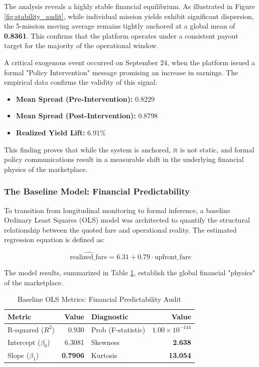 The analysis reveals a highly stable financial equilibrium. As illustrated in Figure \ref{fig:stability_audit}, while individual mission yields exhibit significant dispersion, the 5-mission moving average remains tightly anchored at a global mean of \textbf{0.8361}. This confirms that the platform operates under a consistent payout target for the majority of the operational window.

A critical exogenous event occurred on September 24, when the platform issued a formal "Policy Intervention" message promising an increase in earnings. The empirical data confirms the validity of this signal:
\begin{itemize}
    \item \textbf{Mean Spread (Pre-Intervention):} 0.8229
    \item \textbf{Mean Spread (Post-Intervention):} 0.8798
    \item \textbf{Realized Yield Lift:} 6.91\%
\end{itemize}

This finding proves that while the system is anchored, it is not static, and formal policy communications result in a measurable shift in the underlying financial physics of the marketplace.


\subsubsection*{The Baseline Model: Financial Predictability}

To transition from longitudinal monitoring to formal inference, a baseline Ordinary Least Squares (OLS) model was architected to quantify the structural relationship between the quoted fare and operational reality. The estimated regression equation is defined as:

\begin{equation}
    \widehat{\text{realized\_fare}} = 6.31 + 0.79 \cdot \text{upfront\_fare}
\end{equation}

The model results, summarized in Table \ref{tab:ols_baseline}, establish the global financial "physics" of the marketplace.

\begin{table}[H]
    \centering
    \caption{Baseline OLS Metrics: Financial Predictability Audit}
    \label{tab:ols_baseline}
    \begin{tabularx}{\textwidth}{X r | X r}
        \toprule
        \textbf{Metric} & \textbf{Value} & \textbf{Diagnostic} & \textbf{Value} \\
        \midrule
        R-squared ($R^2$) & 0.930 & Prob (F-statistic) & $1.00 \times 10^{-144}$ \\
        Intercept ($\beta_0$) & 6.3081 & Skewness & \textbf{2.638} \\
        Slope ($\beta_1$) & \textbf{0.7906} & Kurtosis & \textbf{13.054} \\
        \bottomrule
    \end{tabularx}
\end{table}


